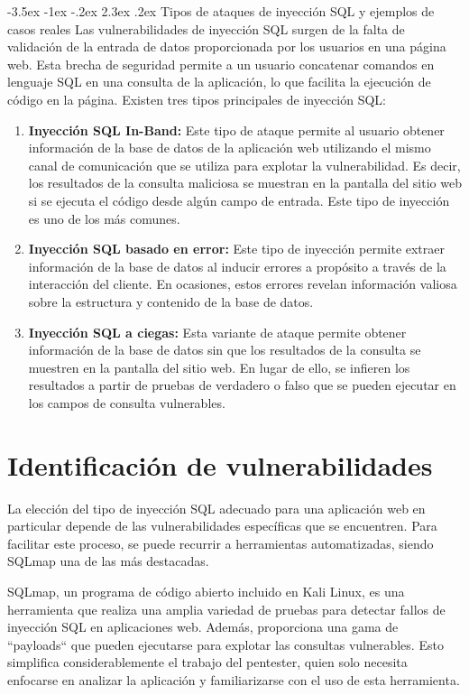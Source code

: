 \documentclass[11pt]{report}
\makeatletter
\renewcommand\chapter{\@startsection{chapter}{0}{\z@}%
    {-3.5ex \@plus -1ex \@minus -.2ex}%
    {2.3ex \@plus.2ex}%
    {\normalfont\Large\bfseries}}
\makeatother
\begin{document}
\chapter{Tipos de ataques de inyección SQL y ejemplos de casos reales}
Las vulnerabilidades de inyección SQL surgen de la falta de validación de la entrada de datos
proporcionada por los usuarios en una página web. Esta brecha de seguridad permite a un usuario
concatenar comandos en lenguaje SQL en una consulta de la aplicación, lo que facilita la ejecución
de código en la página. Existen tres tipos principales de inyección SQL:
\begin{enumerate}
  \item \textbf{Inyección SQL In-Band:} Este tipo de ataque permite al usuario obtener información de
  la base de datos de la aplicación web utilizando el mismo canal de comunicación que se utiliza para
  explotar la vulnerabilidad. Es decir, los resultados de la consulta maliciosa se muestran en la pantalla
  del sitio web si se ejecuta el código desde algún campo de entrada. Este tipo de inyección es uno de los
  más comunes.

  \item \textbf{Inyección SQL basado en error:} Este tipo de inyección permite extraer información de la base
  de datos al inducir errores a propósito a través de la interacción del cliente. En ocasiones, estos errores
  revelan información valiosa sobre la estructura y contenido de la base de datos.

  \item \textbf{Inyección SQL a ciegas:} Esta variante de ataque permite obtener información de la base de datos
  sin que los resultados de la consulta se muestren en la pantalla del sitio web. En lugar de ello, se infieren los
  resultados a partir de pruebas de verdadero o falso que se pueden ejecutar en los campos de consulta vulnerables.
\end{enumerate}

\section{Identificación de vulnerabilidades}
La elección del tipo de inyección SQL adecuado para una aplicación web en particular depende de las vulnerabilidades
específicas que se encuentren. Para facilitar este proceso, se puede recurrir a herramientas automatizadas, siendo
SQLmap una de las más destacadas.

SQLmap, un programa de código abierto incluido en Kali Linux, es una herramienta que realiza una amplia variedad de
pruebas para detectar fallos de inyección SQL en aplicaciones web. Además, proporciona una gama de “payloads“ que pueden
ejecutarse para explotar las consultas vulnerables. Esto simplifica considerablemente el trabajo del pentester, quien
solo necesita enfocarse en analizar la aplicación y familiarizarse con el uso de esta herramienta.
\end{document}

